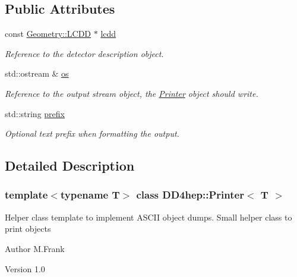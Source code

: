 \subsection*{Public Attributes}
\begin{DoxyCompactItemize}
\item 
const \hyperlink{class_d_d4hep_1_1_geometry_1_1_l_c_d_d}{Geometry::LCDD} $\ast$ \hyperlink{struct_d_d4hep_1_1_printer_a09e1761c59664ca7953a3bead1f44dd4}{lcdd}
\begin{DoxyCompactList}\small\item\em Reference to the detector description object. \item\end{DoxyCompactList}\item 
std::ostream \& \hyperlink{struct_d_d4hep_1_1_printer_a1ec1ad8ef8150a32854541bec0f9d7c8}{os}
\begin{DoxyCompactList}\small\item\em Reference to the output stream object, the \hyperlink{struct_d_d4hep_1_1_printer}{Printer} object should write. \item\end{DoxyCompactList}\item 
std::string \hyperlink{struct_d_d4hep_1_1_printer_a59b1bd251047feee01c469a91564a320}{prefix}
\begin{DoxyCompactList}\small\item\em Optional text prefix when formatting the output. \item\end{DoxyCompactList}\end{DoxyCompactItemize}


\subsection{Detailed Description}
\subsubsection*{template$<$typename T$>$ class DD4hep::Printer$<$ T $>$}

Helper class template to implement ASCII object dumps. Small helper class to print objects

\begin{DoxyAuthor}{Author}
M.Frank 
\end{DoxyAuthor}
\begin{DoxyVersion}{Version}
1.0 
\end{DoxyVersion}


